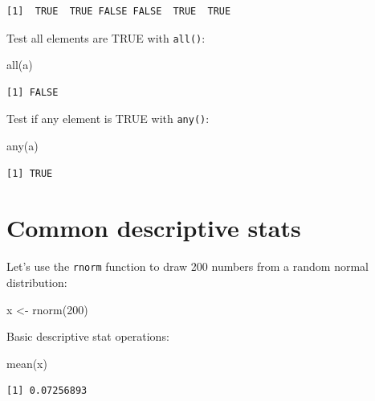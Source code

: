 \documentclass[
]{book}
\newenvironment{Shaded}{\begin{snugshade}}{\end{snugshade}}
\newcommand{\DecValTok}[1]{\textcolor[rgb]{0.00,0.00,0.81}{#1}}
\newcommand{\FunctionTok}[1]{\textcolor[rgb]{0.00,0.00,0.00}{#1}}
\newcommand{\NormalTok}[1]{#1}
\newcommand{\OtherTok}[1]{\textcolor[rgb]{0.56,0.35,0.01}{#1}}
\begin{document}
\begin{verbatim}
[1]  TRUE  TRUE FALSE FALSE  TRUE  TRUE
\end{verbatim}

Test all elements are TRUE with \texttt{all()}:

\begin{Shaded}
\begin{Highlighting}[]
\FunctionTok{all}\NormalTok{(a)}
\end{Highlighting}
\end{Shaded}

\begin{verbatim}
[1] FALSE
\end{verbatim}

Test if any element is TRUE with \texttt{any()}:

\begin{Shaded}
\begin{Highlighting}[]
\FunctionTok{any}\NormalTok{(a)}
\end{Highlighting}
\end{Shaded}

\begin{verbatim}
[1] TRUE
\end{verbatim}

\hypertarget{common-descriptive-stats}{%
\section{Common descriptive stats}\label{common-descriptive-stats}}

Let's use the \texttt{rnorm} function to draw 200 numbers from a random normal distribution:

\begin{Shaded}
\begin{Highlighting}[]
\NormalTok{x }\OtherTok{\textless{}{-}} \FunctionTok{rnorm}\NormalTok{(}\DecValTok{200}\NormalTok{)}
\end{Highlighting}
\end{Shaded}

Basic descriptive stat operations:

\begin{Shaded}
\begin{Highlighting}[]
\FunctionTok{mean}\NormalTok{(x)}
\end{Highlighting}
\end{Shaded}

\begin{verbatim}
[1] 0.07256893
\end{verbatim}
\end{document}
